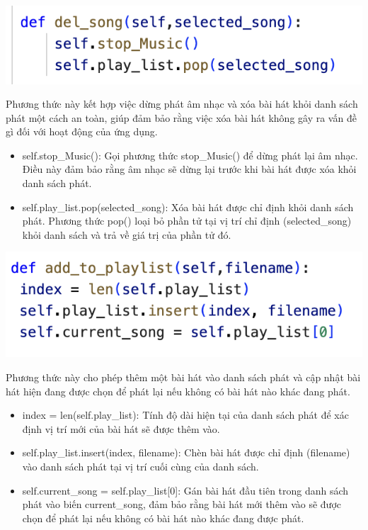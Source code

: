 \documentclass[a4paper]{article}
\begin{document}
\begin{center}
\includegraphics[width=175mm]{template_SGU 2/audio_delsong.png}
\end{center}

\hspace*{0.5} Phương thức này kết hợp việc dừng phát âm nhạc và xóa bài hát khỏi danh sách phát một cách an toàn, giúp đảm bảo rằng việc xóa bài hát không gây ra vấn đề gì đối với hoạt động của ứng dụng.

\begin{itemize}
    \item self.stop\_Music(): Gọi phương thức stop\_Music() để dừng phát lại âm nhạc. Điều này đảm bảo rằng âm nhạc sẽ dừng lại trước khi bài hát được xóa khỏi danh sách phát.
    \item self.play\_list.pop(selected\_song): Xóa bài hát được chỉ định khỏi danh sách phát. Phương thức pop() loại bỏ phần tử tại vị trí chỉ định (selected\_song) khỏi danh sách và trả về giá trị của phần tử đó.
\end{itemize}

\begin{center}
\includegraphics[width=175mm]{template_SGU 2/audio_addto.png}
\end{center}

\hspace*{0.5} Phương thức này cho phép thêm một bài hát vào danh sách phát và cập nhật bài hát hiện đang được chọn để phát lại nếu không có bài hát nào khác đang phát.

\begin{itemize}
    \item index = len(self.play\_list): Tính độ dài hiện tại của danh sách phát để xác định vị trí mới của bài hát sẽ được thêm vào.
    \item self.play\_list.insert(index, filename): Chèn bài hát được chỉ định (filename) vào danh sách phát tại vị trí cuối cùng của danh sách.
    \item self.current\_song = self.play\_list[0]: Gán bài hát đầu tiên trong danh sách phát vào biến current\_song, đảm bảo rằng bài hát mới thêm vào sẽ được chọn để phát lại nếu không có bài hát nào khác đang được phát.
\end{itemize}
\end{document}
